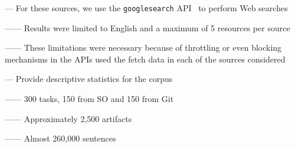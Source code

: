 \vspace{3mm}

--- For these sources, we use the \texttt{googlesearch} API~\cite{googlesearch} to perform Web searches

------ Results were limited to English and a maximum of 5 resources per source 

------ These limitations were necessary because of throttling or even blocking mechanisms in the APIs used the fetch data in each of the sources considered \vspace{3mm}

--- Provide descriptive statistics for the corpus

------ 300 tasks, 150 from SO and 150 from Git

------ Approximately 2,500 artifacts

------ Almost 260,000 sentences







% 


